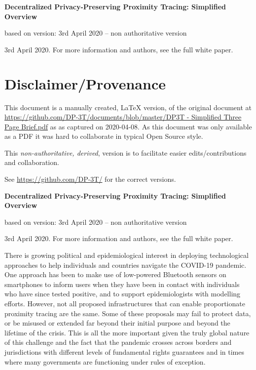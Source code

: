 \documentclass[12pt,a4paper]{article}
\begin{document}
\begin{center}
\textbf{Decentralized Privacy-Preserving Proximity Tracing: Simplified Overview}

 based on version: 3rd April 2020 -- non authoritative version

3rd April 2020. For more information and authors, see the full white paper.\vspace{0.2cm}


\section*{Disclaimer/Provenance}

This document is a manually created, LaTeX version, of the original document at \url{https://github.com/DP-3T/documents/blob/master/DP3T - Simplified Three Page Brief.pdf} as 
as captured on 2020-04-08. As this document was only available as a PDF it was hard to collaborate in typical Open Source style.

This\emph{ non-authoritative, derived}, version is to facilitate easier edits/contributions and collaboration.

See \url{https://github.com/DP-3T/} for the correct versions.
\end{center}

\pagebreak
\begin{center}
\textbf{Decentralized Privacy-Preserving Proximity Tracing: Simplified Overview}

 based on version: 3rd April 2020 -- non authoritative version

3rd April 2020. For more information and authors, see the full white paper.\vspace{0.2cm}
\end{center}

There is growing political and epidemiological interest in deploying technological approaches to help individuals and countries navigate the COVID-19 pandemic. One approach has been to make use of low-powered Bluetooth sensors on smartphones to inform users when they have been in contact with individuals who have since tested positive, and to support
epidemiologists with modelling efforts. However, not all proposed infrastructures that can
enable proportionate proximity tracing are the same. Some of these proposals may fail to
protect data, or be misused or extended far beyond their initial purpose and beyond the
lifetime of the crisis. This is all the more important given the truly global nature of this challenge and the fact that the pandemic crosses across borders and jurisdictions with different levels of fundamental rights guarantees and in times where many governments are functioning under rules of exception.
\end{document}
